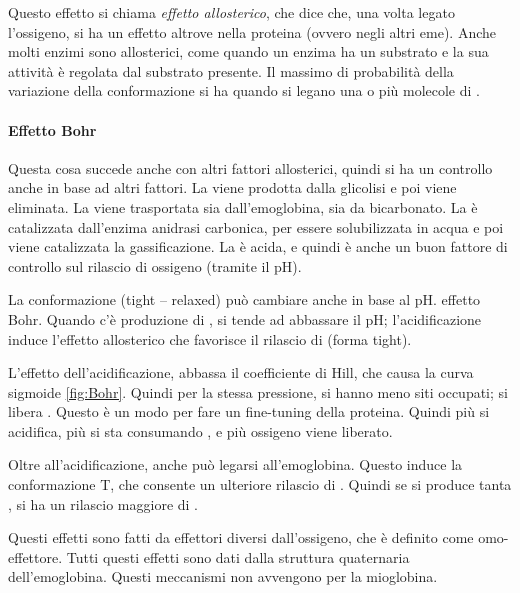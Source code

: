 Questo effetto si chiama \emph{effetto allosterico}, che dice che, una volta legato
l'ossigeno, si ha un effetto altrove nella proteina (ovvero negli altri
eme). Anche molti enzimi sono allosterici, come quando un enzima ha un
substrato e la sua attività è regolata dal substrato presente.
Il massimo di probabilità della variazione della conformazione si ha
quando si legano una o più molecole di .

\paragraph{Effetto Bohr}

Questa cosa succede anche con altri fattori allosterici, quindi si ha un
controllo anche in base ad altri fattori.
La  viene prodotta dalla glicolisi e poi viene eliminata. La
 viene trasportata sia dall'emoglobina, sia da bicarbonato.
La  è catalizzata dall'enzima anidrasi carbonica, per essere
solubilizzata in acqua e poi viene catalizzata la gassificazione.
La  è acida, e quindi è anche un buon fattore di controllo sul
rilascio di ossigeno (tramite il pH).

La conformazione (tight -- relaxed) può cambiare anche in base al pH.
effetto Bohr.
Quando c'è produzione di , si tende ad abbassare il pH;
l'acidificazione induce l'effetto allosterico che favorisce il rilascio
di  (forma tight).


L'effetto dell'acidificazione, abbassa il coefficiente di Hill, che
causa la curva sigmoide {}\ref{fig:Bohr}. Quindi per la stessa pressione, si hanno
meno siti occupati; si libera .
Questo è un modo per fare un fine-tuning della proteina.
Quindi più si acidifica, più si sta consumando , e più ossigeno viene
liberato.

Oltre all'acidificazione, anche  può legarsi all'emoglobina.
Questo induce la conformazione T, che consente un ulteriore rilascio di
.
Quindi se si produce tanta , si ha un rilascio maggiore di
.

Questi effetti sono fatti da effettori diversi dall'ossigeno, che è
definito come omo-effettore. Tutti questi effetti sono dati dalla
struttura quaternaria dell'emoglobina.
Questi meccanismi non avvengono per la mioglobina.

\vfill
\pagebreak

